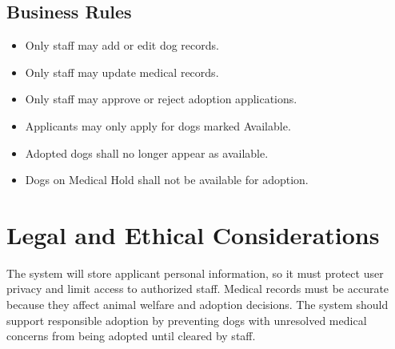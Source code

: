 \documentclass[12pt]{article}
\begin{document}
\subsection{Business Rules}
\begin{itemize}\item Only staff may add or edit dog records.\end{itemize}
\begin{itemize}\item Only staff may update medical records.\end{itemize}
\begin{itemize}\item Only staff may approve or reject adoption applications.\end{itemize}
\begin{itemize}\item Applicants may only apply for dogs marked Available.\end{itemize}
\begin{itemize}\item Adopted dogs shall no longer appear as available.\end{itemize}
\begin{itemize}\item Dogs on Medical Hold shall not be available for adoption.\end{itemize}
\section{Legal and Ethical Considerations}
The system will store applicant personal information, so it must protect user privacy and limit access to authorized staff. Medical records must be accurate because they affect animal welfare and adoption decisions. The system should support responsible adoption by preventing dogs with unresolved medical concerns from being adopted until cleared by staff.
\end{document}
